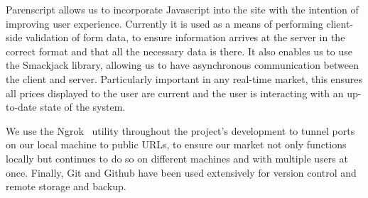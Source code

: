 Parenscript allows us to incorporate Javascript into the site with the
intention of improving user experience. Currently it is used as a means of
performing client-side validation of form data, to ensure information arrives
at the server in the correct format and that all the necessary data is there.
It also enables us to use the Smackjack library, allowing us to have
asynchronous communication between the client and server. Particularly
important in any real-time market, this ensures all prices displayed to the
user are current and the user is interacting with an up-to-date state of the
system.

We use the Ngrok~\cite{ngrok} utility throughout the project's development to
tunnel ports on our local machine to public URLs, to ensure our market not only
functions locally but continues to do so on different machines and with
multiple users at once. Finally, Git and Github have been used extensively for
version control and remote storage and backup.
